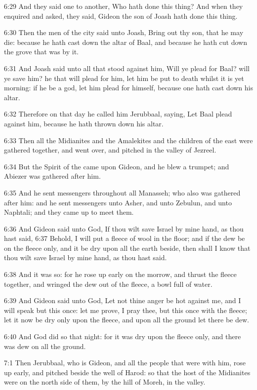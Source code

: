 6:29 And they said one to another, Who hath done this thing? And when
they enquired and asked, they said, Gideon the son of Joash hath done
this thing.

6:30 Then the men of the city said unto Joash, Bring out thy son, that
he may die: because he hath cast down the altar of Baal, and because
he hath cut down the grove that was by it.

6:31 And Joash said unto all that stood against him, Will ye plead for
Baal? will ye save him? he that will plead for him, let him be put to
death whilst it is yet morning: if he be a god, let him plead for
himself, because one hath cast down his altar.

6:32 Therefore on that day he called him Jerubbaal, saying, Let Baal
plead against him, because he hath thrown down his altar.

6:33 Then all the Midianites and the Amalekites and the children of
the east were gathered together, and went over, and pitched in the
valley of Jezreel.

6:34 But the Spirit of the \LORD came upon Gideon, and he blew a
trumpet; and Abiezer was gathered after him.

6:35 And he sent messengers throughout all Manasseh; who also was
gathered after him: and he sent messengers unto Asher, and unto
Zebulun, and unto Naphtali; and they came up to meet them.

6:36 And Gideon said unto God, If thou wilt save Israel by mine hand,
as thou hast said, 6:37 Behold, I will put a fleece of wool in the
floor; and if the dew be on the fleece only, and it be dry upon all
the earth beside, then shall I know that thou wilt save Israel by mine
hand, as thou hast said.

6:38 And it was so: for he rose up early on the morrow, and thrust the
fleece together, and wringed the dew out of the fleece, a bowl full of
water.

6:39 And Gideon said unto God, Let not thine anger be hot against me,
and I will speak but this once: let me prove, I pray thee, but this
once with the fleece; let it now be dry only upon the fleece, and upon
all the ground let there be dew.

6:40 And God did so that night: for it was dry upon the fleece only,
and there was dew on all the ground.

7:1 Then Jerubbaal, who is Gideon, and all the people that were with
him, rose up early, and pitched beside the well of Harod: so that the
host of the Midianites were on the north side of them, by the hill of
Moreh, in the valley.

